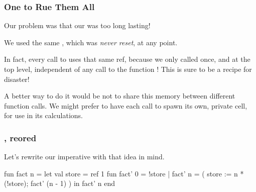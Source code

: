 \documentclass[aspectratio=169]{beamer}
\begin{document}
\begin{frame}[fragile]
  \frametitle{One  to Rue Them All}

  Our problem was that our  was too long lasting!

  \vspace{\fill}

  We used the same , which was \textit{never reset}, at any point.

  \pause
  \vspace{\fill}

  In fact, every call to  uses that same ref, because we only called
   once, and at the top level, independent of any call to the function
  ! This is sure to be a recipe for disaster!

  \pause
  \vspace{\fill}

  A better way to do it would be not to share this memory between different function
  calls. We might prefer to have each call to  spawn its own, private
   cell, for use in its calculations.
\end{frame}

\begin{frame}[fragile]
  \frametitle{, reored}

  Let's rewrite our imperative  with that idea in mind.

  \pause
  \vspace{\fill}

  \begin{codeblock}
    fun fact n =
      let
        val store = ref 1
        fun fact' 0 = !store
          | fact' n =
              ( store := n * (!store);
                fact' (n - 1)
              )
      in
        fact' n
      end
  \end{codeblock}
\end{frame}
\end{document}
